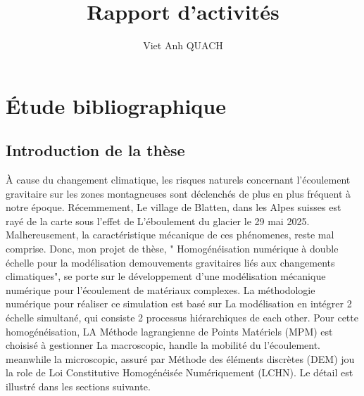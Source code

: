 \documentclass[a4paper,12pt]{report}
\title{Rapport d'activités}
\author{Viet Anh QUACH}
\begin{document}
\maketitle
\tableofcontents

\setcounter{secnumdepth}{4}

\chapter{Étude bibliographique}
\section{Introduction de la thèse}
À cause du changement climatique, les risques naturels concernant l'écoulement gravitaire sur les zones montagneuses sont déclenchés de plus en plus fréquent à notre époque. 
Récemmement, Le village de Blatten, dans les Alpes suisses est rayé de la carte sous l'effet de L’éboulement du glacier le 29 mai 2025. 
Malhereusement, la caractéristique mécanique de ces phénomenes, reste mal comprise. 
Donc, mon projet de thèse, " Homogénéisation numérique à double échelle pour la modélisation demouvements gravitaires liés aux changements climatiques", se porte sur le développement d'une modélisation mécanique numérique pour l’écoulement de matériaux complexes. 
La méthodologie numérique pour réaliser ce simulation est basé sur La modélisation en intégrer 2 échelle simultané, qui consiste 2 processus hiérarchiques de each other. 
Pour cette homogénéisation, LA Méthode lagrangienne de Points Matériels (MPM) est choisisé à gestionner  La macroscopic, handle la mobilité du l'écoulement. 
meanwhile la microscopic, assuré par Méthode des éléments discrètes (DEM) jou la role de Loi Constitutive Homogénéisée Numériquement (LCHN). Le détail est illustré dans les sections suivante.
\end{document}
